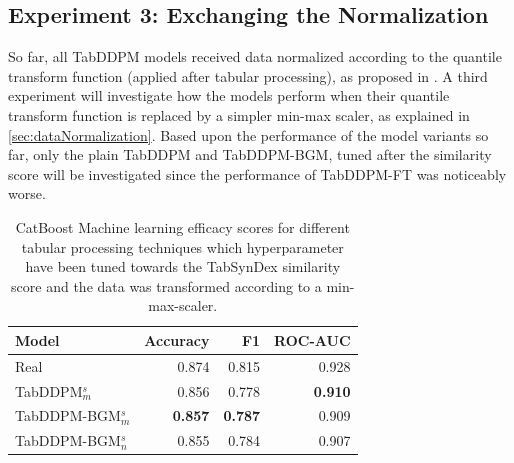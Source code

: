 \subsection{Experiment 3: Exchanging the Normalization}
\label{ch:Experiment-3}

So far, all TabDDPM models received data normalized according to the quantile transform function (applied after tabular processing), as proposed in \cite{kotelnikov2022TabDDPMModellingTabular}.
A third experiment will investigate how the models perform when their quantile transform function is replaced by a simpler min-max scaler, as explained in \autoref{sec:dataNormalization}.
Based upon the performance of the model variants so far, only the plain TabDDPM and TabDDPM-BGM, tuned after the similarity score will be investigated since the performance of
TabDDPM-FT was noticeably worse.


\begin{table}[h]
	\centering
	\begin{tabular}{lrrr}
		\toprule
		\textbf{Model}        & \textbf{Accuracy} & \textbf{F1}    & \textbf{ROC-AUC} \\
		\midrule
		Real                  & 0.874              & 0.815          & 0.928            \\
		TabDDPM$^{s}_{m}$     & 0.856              & 0.778          & \textbf{0.910}   \\
		TabDDPM-BGM$^{s}_{m}$ & \textbf{0.857}     & \textbf{0.787} & 0.909            \\
		TabDDPM-BGM$^{s}_{n}$ & 0.855              & 0.784          & 0.907            \\
		\bottomrule
	\end{tabular}
	\caption[Experiment 3 ML-Efficacy]{CatBoost Machine learning efficacy scores for different tabular processing techniques which hyperparameter have been tuned towards the TabSynDex similarity score
		and the data was transformed according to a min-max-scaler.}
	\label{tab:exp3-ml}
\end{table}


